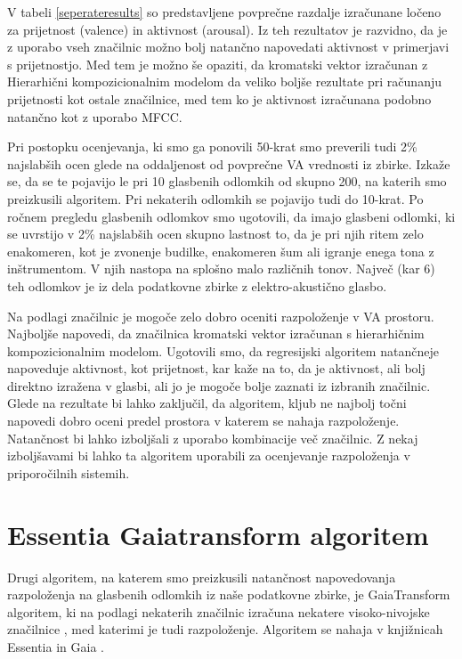 \documentclass[a4paper, 12pt]{book}
\begin{document}
{V tabeli \ref{seperateresults} so predstavljene povprečne razdalje  izračunane ločeno za prijetnost (valence) in aktivnost (arousal). Iz teh rezultatov je razvidno, da je z uporabo vseh značilnic možno bolj natančno  napovedati aktivnost v primerjavi s prijetnostjo. Med tem je možno še opaziti, da kromatski vektor izračunan z Hierarhični kompozicionalnim modelom da veliko boljše rezultate pri računanju prijetnosti kot ostale značilnice, med tem ko je aktivnost izračunana podobno natančno kot z uporabo MFCC. 

Pri postopku ocenjevanja, ki smo ga ponovili 50-krat smo preverili tudi 2\% najslabših ocen glede na oddaljenost od povprečne VA vrednosti iz zbirke. Izkaže se, da se te pojavijo le pri 10 glasbenih odlomkih od skupno 200, na katerih smo preizkusili algoritem. Pri nekaterih odlomkih se pojavijo tudi do 10-krat. Po ročnem pregledu glasbenih odlomkov smo ugotovili, da imajo glasbeni odlomki, ki se uvrstijo v 2\% najslabših ocen skupno lastnost to, da je pri njih ritem zelo enakomeren, kot je zvonenje budilke, enakomeren šum ali igranje enega tona z inštrumentom. V njih nastopa na splošno malo različnih tonov. Največ (kar 6) teh odlomkov je iz dela podatkovne zbirke z elektro-akustično glasbo.   

Na podlagi značilnic je mogoče zelo dobro oceniti razpoloženje v VA prostoru. Najboljše napovedi, da značilnica kromatski vektor izračunan s hierarhičnim kompozicionalnim modelom. Ugotovili smo, da regresijski algoritem natančneje napoveduje aktivnost, kot prijetnost, kar kaže na to, da je aktivnost, ali bolj direktno izražena v glasbi, ali jo je mogoče bolje zaznati iz izbranih značilnic. Glede na rezultate bi lahko zaključil, da algoritem, kljub ne najbolj točni napovedi dobro oceni predel prostora v katerem se nahaja razpoloženje. Natančnost bi lahko izboljšali z uporabo kombinacije več značilnic. Z nekaj izboljšavami bi lahko ta algoritem uporabili za ocenjevanje razpoloženja v priporočilnih sistemih.

\section{Essentia Gaiatransform algoritem}

Drugi algoritem, na katerem smo preizkusili natančnost napovedovanja razpoloženja na glasbenih odlomkih iz naše podatkovne zbirke, je GaiaTransform algoritem, ki na podlagi nekaterih značilnic izračuna nekatere visoko-nivojske značilnice \cite{bogdanov2013form}, med katerimi je tudi razpoloženje. Algoritem se nahaja v knjižnicah Essentia in Gaia \cite{bogdanov2013essentia}.

}
\end{document}
